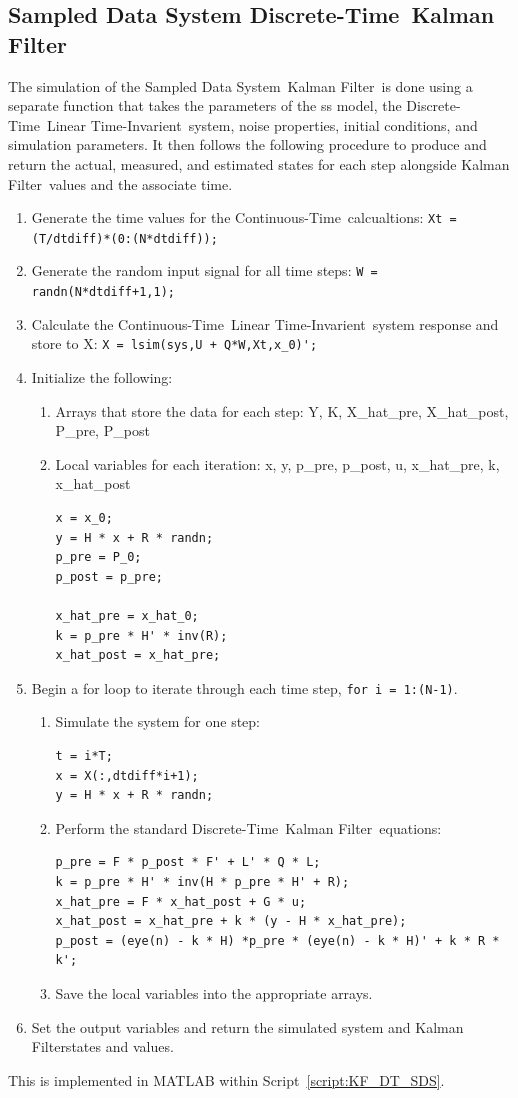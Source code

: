 \documentclass[]{article}
\renewcommand{\lstlistingname}{Script}
\newcommand{\scriptname}{\lstlistingname}
\newcommand{\KF}{Kalman Filter}
\newcommand{\CT}{Continuous-Time}
\newcommand{\DT}{Discrete-Time}
\newcommand{\DTKF}{\DT \ \KF}
\newcommand{\LTI}{Linear Time-Invarient}
\newcommand{\SDS}{Sampled Data System}
\begin{document}
	\subsection{Sampled Data System \DTKF}
		The simulation of the \SDS \ \KF \ is done using a separate function that takes the parameters of the ss model, the \DT \ \LTI \ system, noise properties, initial conditions, and simulation parameters. It then follows the following procedure to produce and return the actual, measured, and estimated states for each step alongside \KF \ values and the associate time. 
		\begin{enumerate}
			\item Generate the time values for the \CT \ calcualtions: \lstinline{Xt = (T/dtdiff)*(0:(N*dtdiff));}
			\item Generate the random input signal for all time steps: \lstinline{W = randn(N*dtdiff+1,1);}
			\item Calculate the \CT \ \LTI \ system response and store to X: \lstinline{X = lsim(sys,U + Q*W,Xt,x_0)';}
			\item Initialize the following:
			\begin{enumerate}
				\item Arrays that store the data for each step: Y, K, X\_hat\_pre, X\_hat\_post, P\_pre, P\_post\\
				\item Local variables for each iteration: x, y, p\_pre, p\_post, u, x\_hat\_pre, k, x\_hat\_post
\begin{lstlisting}
x = x_0;
y = H * x + R * randn;
p_pre = P_0;
p_post = p_pre;

x_hat_pre = x_hat_0;
k = p_pre * H' * inv(R);
x_hat_post = x_hat_pre;
\end{lstlisting}
			\end{enumerate}
			\item Begin a for loop to iterate through each time step, \lstinline{for i = 1:(N-1)}.
			\begin{enumerate}
				\item Simulate the system for one step:
\begin{lstlisting}
t = i*T;
x = X(:,dtdiff*i+1);
y = H * x + R * randn;
\end{lstlisting}
				\item Perform the standard \DTKF \ equations:
\begin{lstlisting}
p_pre = F * p_post * F' + L' * Q * L;
k = p_pre * H' * inv(H * p_pre * H' + R);
x_hat_pre = F * x_hat_post + G * u;
x_hat_post = x_hat_pre + k * (y - H * x_hat_pre);
p_post = (eye(n) - k * H) *p_pre * (eye(n) - k * H)' + k * R * k';
\end{lstlisting}
				\item Save the local variables into the appropriate arrays.
			\end{enumerate}
			\item Set the output variables and return the simulated system and \KF states and values.
		\end{enumerate}
		This is implemented in MATLAB within \scriptname \ \ref{script:KF_DT_SDS}.
		
\end{document}
